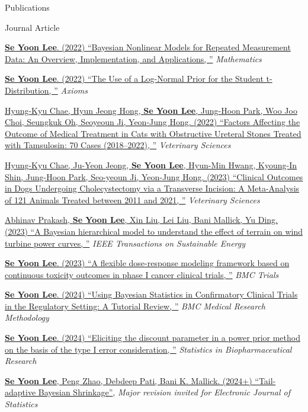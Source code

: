 \documentclass[
	11pt, %
]{resume} %
\begin{document}
\begin{rSection}{Publications}
\begin{rSubsection}{Journal Article}{}{}{}
\item[] [7]
\href{https://www.mdpi.com/2227-7390/10/6/898}
{\underline{\textbf{Se Yoon Lee}}. (2022)
``Bayesian Nonlinear Models for Repeated Measurement Data: An Overview, Implementation, and Applications, ''} \textit{Mathematics} 
\item[] [8]
\href{https://www.mdpi.com/2075-1680/11/9/462}
{\underline{\textbf{Se Yoon Lee}}. (2022)
``The Use of a Log-Normal Prior for the Student t-Distribution, ''} \textit{Axioms} 
\item[] [9]
\href{https://www.mdpi.com/2306-7381/9/10/568}
{Hyung-Kyu Chae, Hyun Jeong Hong, \underline{\textbf{Se Yoon Lee}}, Jung-Hoon Park, Woo Joo Choi, Seungkuk Oh, Seoyeoun Ji, Yeon-Jung Hong. (2022)
``Factors Affecting the Outcome of Medical Treatment in Cats with Obstructive Ureteral Stones Treated with Tamsulosin: 70 Cases (2018–2022), ''} \textit{Veterinary Sciences} 
\item[] [10]
\href{https://www.mdpi.com/2306-7381/10/6/395}
{Hyung-Kyu Chae, Ju-Yeon Jeong, \underline{\textbf{Se Yoon Lee}}, Hyun-Min Hwang, Kyoung-In Shin, Jung-Hoon Park, Seo-yeoun Ji, Yeon-Jung Hong. (2023)
``Clinical Outcomes in Dogs Undergoing Cholecystectomy via
a Transverse Incision: A Meta-Analysis of 121 Animals Treated
between 2011 and 2021, ''} \textit{Veterinary Sciences} 
\item[] [11]
\href{https://ieeexplore.ieee.org/document/10301539}
{Abhinav Prakash, \underline{\textbf{Se Yoon Lee}}, Xin Liu, Lei Liu,  Bani Mallick, Yu Ding. (2023)
``A Bayesian hierarchical model to understand the effect of terrain on wind turbine power curves, ''} \textit{IEEE Transactions on Sustainable Energy} 
\item[] [12]
\href{https://trialsjournal.biomedcentral.com/articles/10.1186/s13063-023-07793-0}
{\underline{\textbf{Se Yoon Lee}}. (2023)
``A flexible dose-response modeling framework based on continuous toxicity outcomes in phase I cancer clinical trials, ''} \textit{BMC Trials} 
\item[] [13]
\href{https://bmcmedresmethodol.biomedcentral.com/articles/10.1186/s12874-024-02235-0}
{\underline{\textbf{Se Yoon Lee}}. (2024)
	``Using Bayesian Statistics in Confirmatory Clinical Trials in the Regulatory Setting: A Tutorial Review, ''} \textit{BMC Medical Research Methodology} 
\item[] [14]
\href{https://www.tandfonline.com/doi/full/10.1080/19466315.2024.2368789?src=exp-la}{\underline{\textbf{Se Yoon Lee}}. (2024)
``Eliciting the discount parameter in a power prior method on the basis of the type I error	consideration, ''} \textit{Statistics in Biopharmaceutical Research}
\item[] [15]
\href{https://arxiv.org/abs/2007.02192}
{\underline{\textbf{Se Yoon Lee}}, Peng Zhao, Debdeep Pati, Bani K. Mallick. (2024+) ``Tail-adaptive Bayesian Shrinkage''}, \textit{Major revision invited for Electronic Journal of Statistics}
\end{rSubsection}


\end{rSection}
\end{document}
